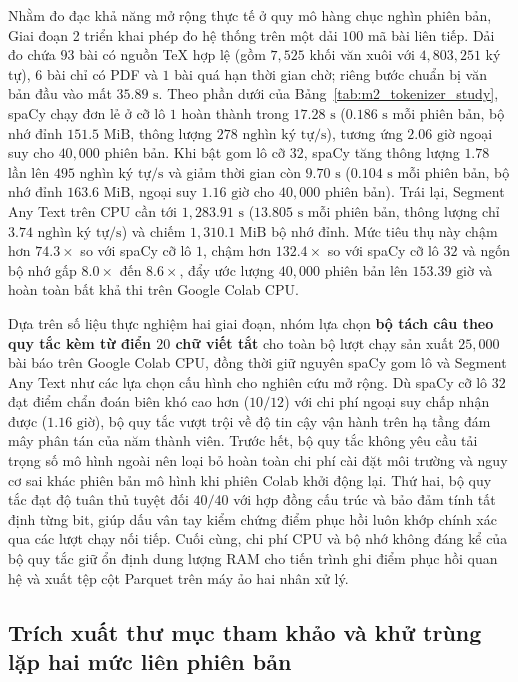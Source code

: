 Nhằm đo đạc khả năng mở rộng thực tế ở quy mô hàng chục nghìn phiên bản, Giai đoạn 2 triển khai phép đo hệ thống trên một dải $100$ mã bài liên tiếp. Dải đo chứa $93$ bài có nguồn TeX hợp lệ (gồm $7{,}525$ khối văn xuôi với $4{,}803{,}251$ ký tự), $6$ bài chỉ có PDF và $1$ bài quá hạn thời gian chờ; riêng bước chuẩn bị văn bản đầu vào mất $35.89\text{ s}$. Theo phần dưới của Bảng~\ref{tab:m2_tokenizer_study}, spaCy chạy đơn lẻ ở cỡ lô $1$ hoàn thành trong $17.28\text{ s}$ ($0.186\text{ s}$ mỗi phiên bản, bộ nhớ đỉnh $151.5\text{ MiB}$, thông lượng $278\text{ nghìn ký tự/s}$), tương ứng $2.06\text{ giờ}$ ngoại suy cho $40{,}000$ phiên bản. Khi bật gom lô cỡ $32$, spaCy tăng thông lượng $1.78$ lần lên $495\text{ nghìn ký tự/s}$ và giảm thời gian còn $9.70\text{ s}$ ($0.104\text{ s}$ mỗi phiên bản, bộ nhớ đỉnh $163.6\text{ MiB}$, ngoại suy $1.16\text{ giờ}$ cho $40{,}000$ phiên bản). Trái lại, Segment Any Text trên CPU cần tới $1{,}283.91\text{ s}$ ($13.805\text{ s}$ mỗi phiên bản, thông lượng chỉ $3.74\text{ nghìn ký tự/s}$) và chiếm $1{,}310.1\text{ MiB}$ bộ nhớ đỉnh. Mức tiêu thụ này chậm hơn $74.3\times$ so với spaCy cỡ lô $1$, chậm hơn $132.4\times$ so với spaCy cỡ lô $32$ và ngốn bộ nhớ gấp $8.0\times$ đến $8.6\times$, đẩy ước lượng $40{,}000$ phiên bản lên $153.39\text{ giờ}$ và hoàn toàn bất khả thi trên Google Colab CPU.

Dựa trên số liệu thực nghiệm hai giai đoạn, nhóm lựa chọn \textbf{bộ tách câu theo quy tắc kèm từ điển $20$ chữ viết tắt} cho toàn bộ lượt chạy sản xuất $25{,}000$ bài báo trên Google Colab CPU, đồng thời giữ nguyên spaCy gom lô và Segment Any Text như các lựa chọn cấu hình cho nghiên cứu mở rộng. Dù spaCy cỡ lô $32$ đạt điểm chẩn đoán biên khó cao hơn ($10/12$) với chi phí ngoại suy chấp nhận được ($1.16\text{ giờ}$), bộ quy tắc vượt trội về độ tin cậy vận hành trên hạ tầng đám mây phân tán của năm thành viên. Trước hết, bộ quy tắc không yêu cầu tải trọng số mô hình ngoài nên loại bỏ hoàn toàn chi phí cài đặt môi trường và nguy cơ sai khác phiên bản mô hình khi phiên Colab khởi động lại. Thứ hai, bộ quy tắc đạt độ tuân thủ tuyệt đối $40/40$ với hợp đồng cấu trúc và bảo đảm tính tất định từng bit, giúp dấu vân tay kiểm chứng điểm phục hồi luôn khớp chính xác qua các lượt chạy nối tiếp. Cuối cùng, chi phí CPU và bộ nhớ không đáng kể của bộ quy tắc giữ ổn định dung lượng RAM cho tiến trình ghi điểm phục hồi quan hệ và xuất tệp cột Parquet trên máy ảo hai nhân xử lý.

\subsection{Trích xuất thư mục tham khảo và khử trùng lặp hai mức liên phiên bản}

